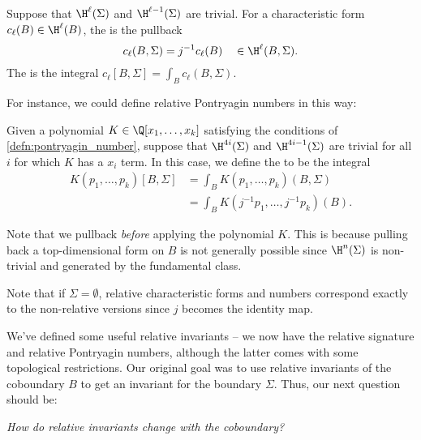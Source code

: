 \begin{definition}\label{defn:relative_characteristic_form}
	Suppose that $\H^{\ell}(\Sigma)$ and $\H^{\ell-1}(\Sigma)$ are trivial. For a characteristic form $c_\ell(B) \in \H^{\ell}(B)$, the  is the pullback
	\[
		c_\ell(B, \Sigma) = j^{-1} c_\ell(B) \quad\in \H^{\ell}(B, \Sigma).
	\]
	The  is the integral $c_\ell[B,\Sigma]=\int_B c_\ell(B,\Sigma)$.
\end{definition}

For instance, we could define relative Pontryagin numbers in this way:

\begin{definition}\label{defn:relative_pontryagin_number}
	Given a polynomial $K\in \Q[x_1,\ldots, x_k]$ satisfying the conditions of \cref{defn:pontryagin_number}, suppose that $\H^{4i}(\Sigma)$ and $\H^{4i-1}(\Sigma)$ are trivial for all $i$ for which $K$ has a $x_i$ term.
	In this case, we define the  to be the integral
	\[
		\begin{aligned}
			K(p_1, \ldots, p_k)[B,\Sigma]
			 & = \int_B K(p_1, \ldots, p_k)(B,\Sigma)       \\
			 & = \int_B K(j^{-1}p_1, \ldots, j^{-1}p_k)(B).
		\end{aligned}
	\]
\end{definition}

\begin{remark}
	Note that we pullback \emph{before} applying the polynomial $K$. This is because pulling back a top-dimensional form on $B$ is not generally possible since $\H^{n}(\Sigma)$ is non-trivial and generated by the fundamental class.
\end{remark}

\begin{remark}
	Note that if $\Sigma=\emptyset$, relative characteristic forms and numbers correspond exactly to the non-relative versions since $j$ becomes the identity map.
\end{remark}

We've defined some useful relative invariants -- we now have the relative signature and relative Pontryagin numbers, although the latter comes with some topological restrictions. Our original goal was to use relative invariants of the coboundary $B$ to get an invariant for the boundary $\Sigma$. Thus, our next question should be:
\begin{center}
	\textsl{How do relative invariants change with the coboundary?}
\end{center}

